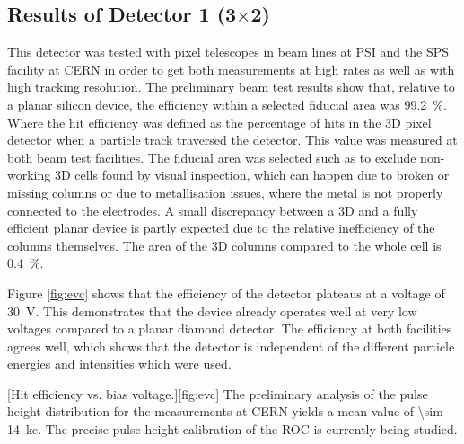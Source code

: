 \subsection{Results of Detector 1 (3$\times$2)}
This detector was tested with pixel telescopes in beam lines at \ac{PSI} and the SPS facility at CERN in order to get both measurements at high rates as well as with high tracking resolution. The preliminary beam test results show that, relative to a planar silicon device, the efficiency within a selected fiducial area was \SI{99.2}{\%}. Where the hit efficiency was defined as the percentage of hits in the 3D pixel detector when a particle track traversed the detector. This value was measured at both beam test facilities. The fiducial area was selected such as to exclude non-working 3D cells found by visual inspection, which can happen due to broken or missing columns or due to metallisation issues, where the metal is not properly connected to the electrodes. A small discrepancy between a 3D and a fully efficient planar device is partly expected due to the relative inefficiency of the columns themselves. The area of the 3D columns compared to the whole cell is \SI{.4}{\%}. \par 
Figure \vref{fig:evc} shows that the efficiency of the detector plateaus at a voltage of \SI{30}{\volt}. This demonstrates that the device already operates well at very low voltages compared to a planar diamond detector. The efficiency at both facilities agrees well, which shows that the detector is independent of the different particle energies and intensities which were used.\par 
{}[Hit efficiency vs. bias voltage.][fig:evc]
The preliminary analysis of the pulse height distribution for the measurements at CERN yields a mean value of \SI{\sim 14}{\kilo e}. The precise pulse height calibration of the \ac{ROC} is currently being studied.